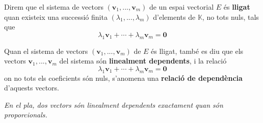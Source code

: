 \begin{definicio}
Direm que el sistema de vectors $(\mathbf{v}_{1},...,\mathbf{v}_{m})$ de
un espai vectorial $E$ és \textbf{lligat} quan existeix una successió finita $\left( \lambda _{1},...,\lambda _{m}\right) $ d’elements de 
$\mathbb{K}$, no tots nuls, tals que%
\begin{equation*}
\lambda _{1}\mathbf{v}_{1}+\cdots +\lambda _{m}\mathbf{v}_{m}=\mathbf{0}
\end{equation*}

Quan el sistema de vectors $(\mathbf{v}_{1},...,\mathbf{v}_{m})$ de $%
E$ és lligat, també es diu que els vectors $\mathbf{v}%
_{1},...,\mathbf{v}_{m}$ del sistema són \textbf{linealment dependents},
i la relació 
\begin{equation*}
\lambda _{1}\mathbf{v}_{1}+\cdots +\lambda _{m}\mathbf{v}_{m}=\mathbf{0}
\end{equation*}%
on no tots els coeficients són nuls, s’anomena una \textbf{relació de dependència} d'aquests vectors.
\end{definicio}

\begin{center}
%

{\small\itshape En el pla, dos vectors són linealment dependents exactament quan són proporcionals.}
\end{center}

